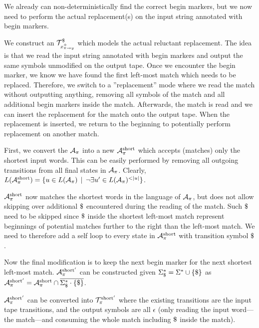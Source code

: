 We already can non-deterministically find the correct begin markers, but we now need to perform the actual replacement(s) on the input string annotated with begin markers.

We construct an \nft $\mathcal{T}^\$_{x^{+}_{\pi \rightarrow y}}$ which models the actual reluctant replacement.
The idea is that we read the input string annotated with begin markers and output the same symbols unmodified on the output tape.
Once we encounter the begin marker, we know we have found the first left-most match which needs to be replaced.
Therefore, we switch to a ''replacement'' mode where we read the match without outputting anything, removing all symbols of the match and all additional begin markers inside the match.
Afterwards, the match is read and we can insert the replacement for the match onto the output tape.
When the replacement is inserted, we return to the beginning to potentially perform replacement on another match.

First, we convert the $\mathcal{A}_{\pi}$ into a new \nfa $\mathcal{A}^{\text{short}}_{\pi}$ which accepts (matches) only the shortest input words.
This can be easily performed by removing all outgoing transitions from all final states in $\mathcal{A}_{\pi}$.
Clearly, $\langof{\aut^{\text{short}}_{\pi}} = \{ u \in \langof{\aut_{\pi}} \,\mid\, \neg \exists u' \in \langof{\aut_{\pi}}^{<|u|} \}$.

$\mathcal{A}^{\text{short}}_{\pi}$ now matches the shortest words in the language of $\mathcal{A}_{\pi}$, but does not allow skipping over additional $\marker$ encountered during the reading of the match.
Such $\marker$ need to be skipped since $\marker$ inside the shortest left-most match represent beginnings of potential matches further to the right than the left-most match.
We need to therefore add a self loop to every state in $\mathcal{A}^{\text{short}}_{\pi}$ with transition symbol $\marker$.

Now the final modification is to keep the next begin marker for the next shortest left-most match. $\mathcal{A}^{\text{short}'}_{\pi}$ can be constructed given $\Sigma^*_\$ = \Sigma^* \cup \{ \$ \}$ as $\mathcal{A}^{\text{short}'}_{\pi} = \mathcal{A}^{\text{short}}_{\pi} \cap \overline{\Sigma^*_\$ \cdot \{ \$ \}}$.

$\mathcal{A}^{\text{short}'}_{\pi}$ can be converted into $\mathcal{T}^{\text{short}'}_{\pi}$ where the existing transitions are the input tape transitions, and the output symbols are all $\epsilon$ (\nft only reading the input word---the match---and consuming the whole match including $\marker$ inside the match).

